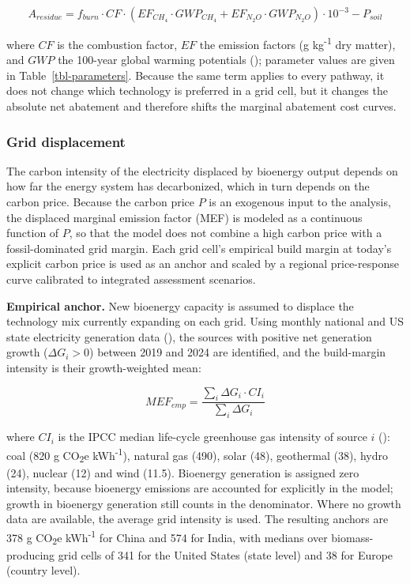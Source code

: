 \documentclass[
  letterpaper,
]{article}
\begin{document}
\[A_{residue} = f_{burn} \cdot CF \cdot \left(EF_{CH_4} \cdot GWP_{CH_4} + EF_{N_2O} \cdot GWP_{N_2O}\right) \cdot 10^{-3} - P_{soil}\]

where \(CF\) is the combustion factor, \(EF\) the emission factors (g
kg\textsuperscript{-1} dry matter), and \(GWP\) the 100-year global
warming potentials (); parameter
values are given in Table~\ref{tbl-parameters}. Because the same term
applies to every pathway, it does not change which technology is
preferred in a grid cell, but it changes the absolute net abatement and
therefore shifts the marginal abatement cost curves.

\subsubsection{Grid displacement}\label{grid-displacement}

The carbon intensity of the electricity displaced by bioenergy output
depends on how far the energy system has decarbonized, which in turn
depends on the carbon price. Because the carbon price \(P\) is an
exogenous input to the analysis, the displaced marginal emission factor
(MEF) is modeled as a continuous function of \(P\), so that the model
does not combine a high carbon price with a fossil-dominated grid
margin. Each grid cell's empirical build margin at today's explicit
carbon price is used as an anchor and scaled by a regional
price-response curve calibrated to integrated assessment scenarios.

\textbf{Empirical anchor.} New bioenergy capacity is assumed to displace
the technology mix currently expanding on each grid. Using monthly
national and US state electricity generation data
(), the sources with positive net
generation growth (\(\Delta G_i > 0\)) between 2019 and 2024 are
identified, and the build-margin intensity is their growth-weighted
mean:

\[MEF_{emp} = \frac{\sum_i \Delta G_{i} \cdot CI_{i}}{\sum_i \Delta G_{i}}\]

where \(CI_i\) is the IPCC median life-cycle greenhouse gas intensity of
source \(i\) (): coal (820 g
CO\textsubscript{2}e kWh\textsuperscript{-1}), natural gas (490), solar
(48), geothermal (38), hydro (24), nuclear (12) and wind (11.5).
Bioenergy generation is assigned zero intensity, because bioenergy
emissions are accounted for explicitly in the model; growth in bioenergy
generation still counts in the denominator. Where no growth data are
available, the average grid intensity is used. The resulting anchors are
378 g CO\textsubscript{2}e kWh\textsuperscript{-1} for China and 574 for
India, with medians over biomass-producing grid cells of 341 for the
United States (state level) and 38 for Europe (country level).
\end{document}
